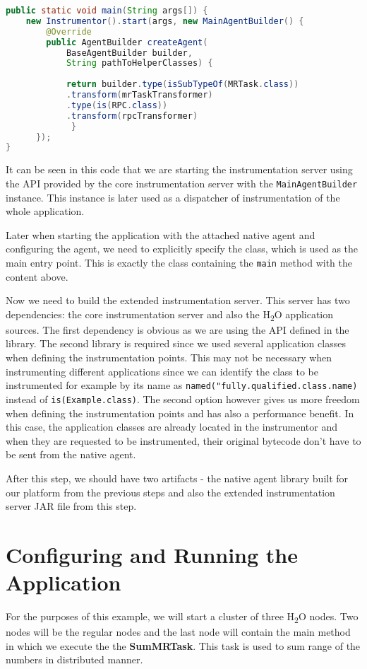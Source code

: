 \begin{lstlisting}[language=Java]
 public static void main(String args[]) {
	new Instrumentor().start(args, new MainAgentBuilder() {
		@Override
		public AgentBuilder createAgent(
			BaseAgentBuilder builder,
			String pathToHelperClasses) {
	 		 
			return builder.type(isSubTypeOf(MRTask.class))
			.transform(mrTaskTransformer)
			.type(is(RPC.class))
			.transform(rpcTransformer)
	         }
	  });
}			 
\end{lstlisting}
It can be seen in this code that we are starting the instrumentation server using the API provided by the core instrumentation server with the \texttt{MainAgentBuilder} instance. This instance is later used as a dispatcher of instrumentation of the whole application.

Later when starting the application with the attached native agent and configuring the agent, we need to explicitly specify the class, which is used as the main entry point. This is exactly the class containing the \texttt{main} method with the content above.

Now we need to build the extended instrumentation server. This server has two dependencies: the core instrumentation server and also the H\textsubscript{2}O application sources. The first dependency is obvious as we are using the API defined in the library. The second library is required since we used several application classes when defining the instrumentation points. This may not be necessary when instrumenting different applications since we can identify the class to be instrumented for example by its name as \texttt{named("fully.qualified.class.name)} instead of \texttt{is(Example.class)}. The second option however gives us more freedom when defining the instrumentation points and has also a performance benefit. In this case, the application classes are already located in the instrumentor and when they are requested to be instrumented, their original bytecode don't have to be sent from the native agent. 

After this step, we should have two artifacts - the native agent library built for our platform from the previous steps and also the extended instrumentation server JAR file from this step.
\section{Configuring and Running the Application}
For the purposes of this example, we will start a cluster of three H\textsubscript{2}O nodes. Two nodes will be the regular nodes and the last node will contain the main method in which we execute the the \textbf{SumMRTask}. This task is used to sum range of the numbers in distributed manner.

